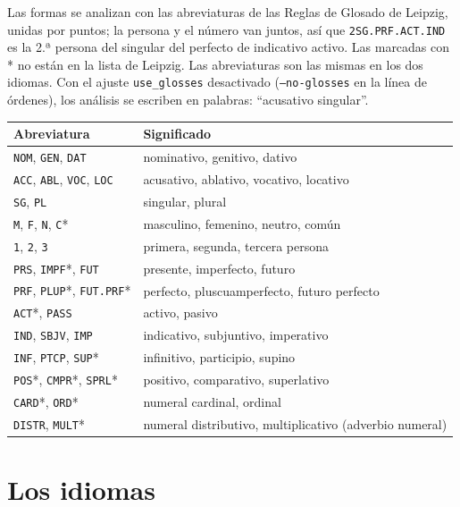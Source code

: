 \documentclass[12pt,
              article,
              oneside
              ]{memoir}
\begin{document}
%
Las formas se analizan con las abreviaturas de las Reglas de Glosado de
Leipzig, unidas por puntos; la persona y el número van juntos, así que
\texttt{2SG.PRF.ACT.IND} es la 2.ª persona del singular del perfecto de
indicativo activo. Las marcadas con * no están en la lista de Leipzig.
Las abreviaturas son las mismas en los dos idiomas. Con el ajuste
\texttt{use\_glosses} desactivado (\texttt{--no-glosses} en la línea de
órdenes), los análisis se escriben en palabras: \enquote{acusativo
singular}.

\begin{longtable}{@{}lp{}@{}}
\toprule
Abreviatura & Significado\\
\midrule
\endhead
\texttt{NOM}, \texttt{GEN}, \texttt{DAT} & nominativo, genitivo, dativo\\
\texttt{ACC}, \texttt{ABL}, \texttt{VOC}, \texttt{LOC} & acusativo, ablativo, vocativo, locativo\\
\texttt{SG}, \texttt{PL} & singular, plural\\
\texttt{M}, \texttt{F}, \texttt{N}, \texttt{C}* & masculino, femenino, neutro, común\\
\texttt{1}, \texttt{2}, \texttt{3} & primera, segunda, tercera persona\\
\texttt{PRS}, \texttt{IMPF}*, \texttt{FUT} & presente, imperfecto, futuro\\
\texttt{PRF}, \texttt{PLUP}*, \texttt{FUT.PRF}* & perfecto, pluscuamperfecto, futuro perfecto\\
\texttt{ACT}*, \texttt{PASS} & activo, pasivo\\
\texttt{IND}, \texttt{SBJV}, \texttt{IMP} & indicativo, subjuntivo, imperativo\\
\texttt{INF}, \texttt{PTCP}, \texttt{SUP}* & infinitivo, participio, supino\\
\texttt{POS}*, \texttt{CMPR}*, \texttt{SPRL}* & positivo, comparativo, superlativo\\
\texttt{CARD}*, \texttt{ORD}* & numeral cardinal, ordinal\\
\texttt{DISTR}, \texttt{MULT}* & numeral distributivo, multiplicativo (adverbio numeral)\\
\bottomrule
\end{longtable}

\section{Los idiomas}
\label{sec:languages}
\end{document}
